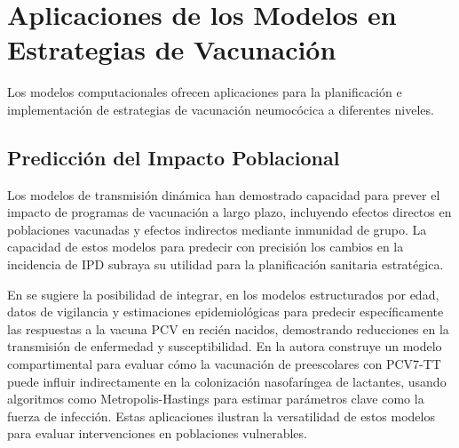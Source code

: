 

\section{Aplicaciones de los Modelos en Estrategias de Vacunación}

Los modelos computacionales ofrecen aplicaciones para la planificación e implementación de estrategias de vacunación neumocócica a diferentes niveles.

\subsection{Predicción del Impacto Poblacional}

Los modelos de transmisión dinámica han demostrado capacidad para prever el impacto de programas de vacunación a largo plazo, incluyendo efectos directos en poblaciones vacunadas y efectos indirectos mediante inmunidad de grupo. La capacidad de estos modelos para predecir con precisión los cambios en la incidencia de IPD subraya su utilidad para la planificación sanitaria estratégica.

En \cite{Obermoser2013} se sugiere la posibilidad de integrar, en los modelos estructurados por edad, datos de vigilancia y estimaciones epidemiológicas para predecir específicamente las respuestas a la vacuna PCV en recién nacidos, demostrando reducciones en la transmisión de enfermedad y susceptibilidad. En \cite{GarciaPolacordoves2022} la autora construye un modelo compartimental para evaluar cómo la vacunación de preescolares con PCV7-TT puede influir indirectamente en la colonización nasofaríngea de lactantes, usando algoritmos como Metropolis-Hastings para estimar parámetros clave como la fuerza de infección.
Estas aplicaciones ilustran la versatilidad de estos modelos para evaluar intervenciones en poblaciones vulnerables.

